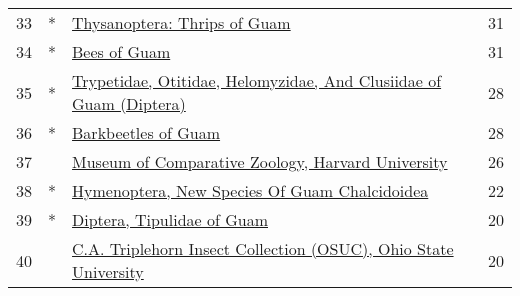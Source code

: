 \begin{longtable}{llp{5in}r}
33 &  * &                                                                                                                                                                     \href{https://www.gbif.org/dataset/9c8d5683-76c1-4938-aede-b7ad5391b6b2}{Thysanoptera: Thrips of Guam} &            31 \\
34 &  * &                                                                                                                                                                                     \href{https://www.gbif.org/dataset/356a98ac-1526-4045-ae7f-52d08e753dfb}{Bees of Guam} &            31 \\
35 &  * &                                                                                                                               \href{https://www.gbif.org/dataset/607dcc60-66ea-494e-b613-ee258734404c}{Trypetidae, Otitidae, Helomyzidae, And Clusiidae of Guam (Diptera)} &            28 \\
36 &  * &                                                                                                                                                                              \href{https://www.gbif.org/dataset/c79684a6-ca35-4efe-be33-dfe58b5b83df}{Barkbeetles of Guam} &            28 \\
37 &    &                                                                                                                                                \href{https://www.gbif.org/dataset/4bfac3ea-8763-4f4b-a71a-76a6f5f243d3}{Museum of Comparative Zoology, Harvard University} &            26 \\
38 &  * &                                                                                                                                                    \href{https://www.gbif.org/dataset/11d04f7a-e744-4ac9-b0af-3cbf68f8cc92}{Hymenoptera, New Species Of Guam Chalcidoidea} &            22 \\
39 &  * &                                                                                                                                                                       \href{https://www.gbif.org/dataset/557bdb7f-b592-4a14-a6a4-ea253697cf9a}{Diptera, Tipulidae of Guam} &            20 \\
40 &    &                                                                                                                                  \href{https://www.gbif.org/dataset/84ab7b76-f762-11e1-a439-00145eb45e9a}{C.A. Triplehorn Insect Collection (OSUC), Ohio State University} &            20 \\

\end{longtable}
